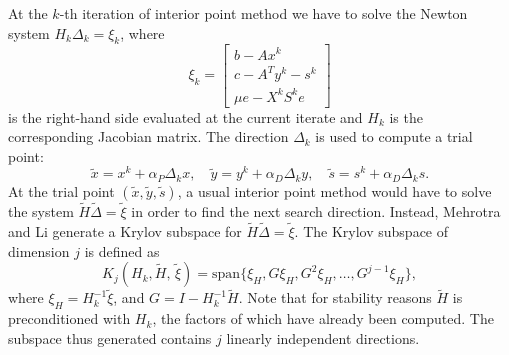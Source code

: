 

At the $k$-th iteration of interior point method we have to solve 
the Newton system $H_k \Delta_k = \xi_k$, where 
\[
\xi_k = 
\left[
  \begin{array}{c}
    b - A x^k \\
    c - A^T y^k - s^k \\
    \mu e - X^k S^k e 
  \end{array}
  \right]
\]
is the right-hand side evaluated at the current iterate and $H_k$ 
is the corresponding Jacobian matrix. 
%
The direction $\Delta_k$ is used to compute a trial point:
\[
\tilde{x} = x^k + \alpha_P \Delta_k x, \quad
\tilde{y} = y^k + \alpha_D \Delta_k y, \quad
\tilde{s} = s^k + \alpha_D \Delta_k s.
\]
%
At the trial point $(\tilde x, \tilde y, \tilde s)$, a usual 
interior point method would have to solve the system
$\tilde H \tilde \Delta = \tilde \xi$
in order to find the next search direction. Instead, 
Mehrotra and Li \cite{MehrotraLi} generate a Krylov subspace 
for $\tilde H \tilde \Delta = \tilde \xi$.
The Krylov subspace of dimension $j$ is defined as
\[
K_j (H_k, \tilde H, \, \tilde \xi) =
{\mbox{span}} \{ \xi_H, G \xi_H, G^2 \xi_H, \dots,  G^{j-1} \xi_H \}, 
\]
where $\xi_H = H_k^{-1} \tilde \xi$, and $G = I - H_k^{-1} \tilde H$. 
Note that for stability reasons $\tilde H$ is preconditioned with $H_k$, 
the factors of which have already been computed.
The subspace thus generated contains $j$ linearly independent directions. 

